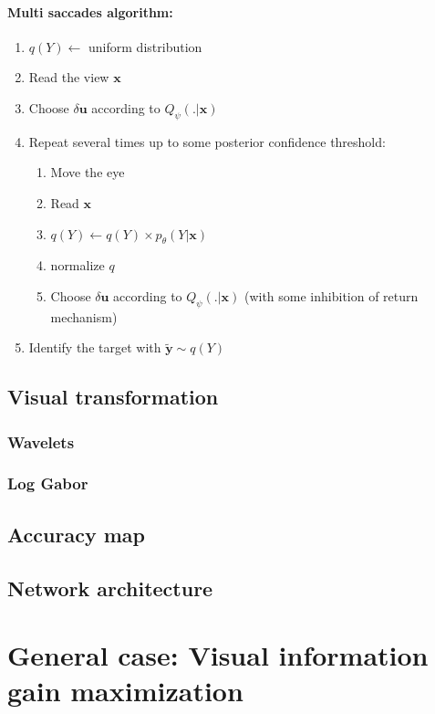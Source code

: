 \paragraph{Multi saccades algorithm:}
\begin{enumerate}
\item $q(Y) \leftarrow$ uniform distribution
\item Read the view $\boldsymbol{x}$
\item Choose $\delta\boldsymbol{u}$ according to $Q_\psi(.|\boldsymbol{x})$
\item Repeat several times up to some posterior confidence threshold:
	\begin{enumerate}
		\item Move the eye
		\item Read $\boldsymbol{x}$
		\item $q(Y) \leftarrow q(Y) \times p_\theta(Y|\boldsymbol{x})$
		\item normalize $q$
		\item Choose $\delta\boldsymbol{u}$ according to $Q_\psi(.|\boldsymbol{x})$ (with some inhibition of return mechanism)
	\end{enumerate}
	\item Identify the target with $\tilde{\boldsymbol{y}} \sim q(Y)$
\end{enumerate}

\subsection{Visual transformation}
\subsubsection{Wavelets}
\subsubsection{Log Gabor}

\subsection{Accuracy map}

\subsection{Network architecture}
\fi


\section*{General case: Visual information gain maximization}\label{sec:case1}

